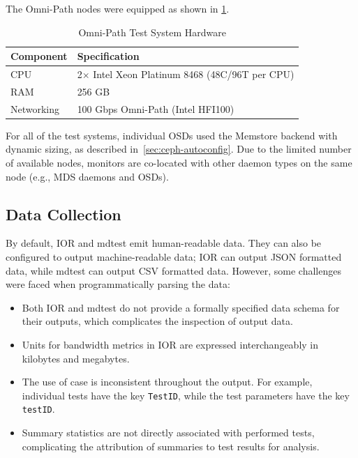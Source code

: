 The Omni-Path nodes were equipped as shown in \cref{tbl:omnipath-system}.

\begin{table}[H]
\centering
\begin{tabular}{|ll|}
\hline
\textbf{Component} & \textbf{Specification} \\
\hline
CPU        & 2$\times$ Intel Xeon Platinum 8468 (48C/96T per CPU) \\
RAM        & 256 GB \\
Networking & 100 Gbps Omni-Path (Intel HFI100) \\
\hline
\end{tabular}
\caption{Omni-Path Test System Hardware}
\label{tbl:omnipath-system}
\end{table}

For all of the test systems, individual \acp{OSD} used the Memstore backend with
dynamic sizing, as described in~\cref{sec:ceph-autoconfig}. Due to the limited
number of available nodes, monitors are co-located with other daemon types on
the same node (e.g., \ac{MDS} daemons and \acp{OSD}).

\subsection{Data Collection}
\label{sec:data-collection}

By default, \ac{IOR} and mdtest emit human-readable data. They can also be
configured to output machine-readable data; \ac{IOR} can output \ac{JSON}
formatted data, while mdtest can output \ac{CSV} formatted data. However, some
challenges were faced when programmatically parsing the data:

\begin{itemize}
    \item Both \ac{IOR} and mdtest do not provide a formally specified data schema for their outputs, which complicates the inspection of output data.
    \item Units for bandwidth metrics in \ac{IOR} are expressed interchangeably in kilobytes and megabytes.
    \item The use of case is inconsistent throughout the output. For example, individual tests have the key \texttt{TestID}, while the test parameters have the key \texttt{testID}.
    \item Summary statistics are not directly associated with performed tests, complicating the attribution of summaries to test results for analysis.
\end{itemize}


